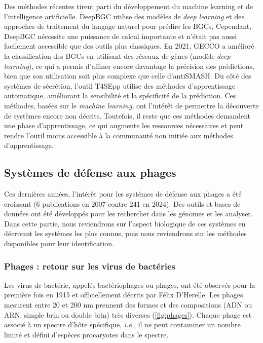 Des méthodes récentes tirent parti du développement du machine learning et de l'intelligence artificielle. DeepBGC \cite{hannigan_deep_2019} utilise des modèles de \textit{deep learning} et des approches de traitement du langage naturel pour prédire les  BGCs,  Cependant, DeepBGC nécessite une puissance de calcul importante et n’était pas aussi facilement accessible que des outils plus classiques. En 2021, GECCO \cite{carroll_accurate_2021} a amélioré la classification des BGCs en utilisant des réseaux de gènes (modèle \textit{deep learning}), ce qui a permis d’affiner encore davantage la précision des prédictions, bien que son utilisation soit plus complexe que celle d’antiSMASH. Du côté des systèmes de sécrétion, l'outil T4SEpp \cite{hu_t4sepp_2024} utilise des méthodes d'apprentissage automatique, améliorant la sensibilité et la spécificité de la prédiction. Ces méthodes, basées sur le \textit{machine learning}, ont l'intérêt de permettre la découverte de systèmes encore non décrits. Toutefois, il reste que ces méthodes demandent une phase d'apprentissage, ce qui augmente les ressources nécessaires et peut rendre l'outil moins accessible à la communauté non initiée aux méthodes d'apprentissage. 

\subsection{Systèmes de défense aux phages}
\label{sec:def}

Ces dernières années, l'intérêt pour les systèmes de défense aux phages a été croissant (6 publications en 2007 contre 241 en 2024). Des outils et bases de données ont été  développés pour les rechercher  dans les génomes et les analyser. Dans cette partie, nous reviendrons sur l'aspect biologique de ces systèmes en décrivant les systèmes les plus connus, puis nous reviendrons sur les méthodes disponibles pour leur identification.

\subsubsection{Phages : retour sur les virus de bactéries}
\label{sec:phage}
Les virus de bactérie, appelés bactériophages ou phages, ont été observés pour la première fois en 1915 et officiellement décrits par Félix D'Herelle. Les phages mesurent entre 20 et 200 nm prennent des formes et des compositions (ADN ou ARN, simple brin ou double brin) très diverses (\autoref{fig:phages}). Chaque phage est associé à un spectre d'hôte spécifique, \textit{i.e.}, il ne peut  contaminer  un nombre limité et défini d'espèces procaryotes dans le spectre. 

